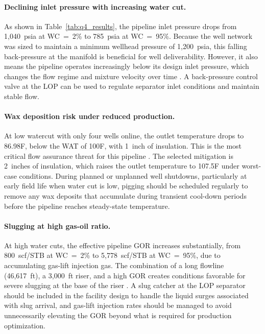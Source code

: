 \paragraph{Declining inlet pressure with increasing water cut.}
As shown in Table~\ref{tab:q4_results}, the pipeline inlet pressure drops from
1{,}040~psia at WC~=~2\% to 785~psia at WC~=~95\%. Because the well network was
sized to maintain a minimum wellhead pressure of 1{,}200~psia, this falling
back-pressure at the manifold is beneficial for well deliverability. However, it
also means the pipeline operates increasingly below its design inlet pressure,
which changes the flow regime and mixture velocity over time \cite{BeggsBrill1973}.
A back-pressure control valve at the LOP can be used to regulate separator inlet
conditions and maintain stable flow.

\paragraph{Wax deposition risk under reduced production.}
At low watercut with only four wells online, the outlet temperature drops to
86.98\textdegree F, below the WAT of 100\textdegree F, with 1~inch of insulation.
This is the most critical flow assurance threat for this pipeline \cite{Bai2005}.
The selected mitigation is 2~inches of insulation, which raises the outlet
temperature to 107.5\textdegree F under worst-case conditions. During planned or
unplanned well shutdowns, particularly at early field life when water cut is low,
pigging should be scheduled regularly to remove any wax deposits that accumulate
during transient cool-down periods before the pipeline reaches steady-state
temperature.

\paragraph{Slugging at high gas-oil ratio.}
At high water cuts, the effective pipeline GOR increases substantially, from
800~scf/STB at WC~=~2\% to 5{,}778~scf/STB at WC~=~95\%, due to accumulating
gas-lift injection gas. The combination of a long flowline (46{,}617~ft), a
3{,}000~ft riser, and a high GOR creates conditions favorable for severe slugging
at the base of the riser \cite{BeggsBrill1973}. A slug catcher at the LOP
separator should be included in the facility design to handle the liquid surges
associated with slug arrival, and gas-lift injection rates should be managed to
avoid unnecessarily elevating the GOR beyond what is required for production
optimization.

